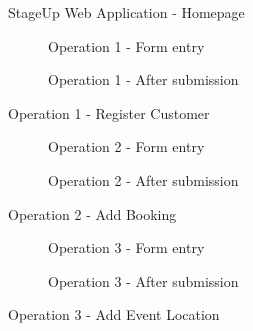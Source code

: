 \begin{figure}[H]
    \centering
    \caption{StageUp Web Application - Homepage}
\end{figure}

\begin{figure}[H]
    \centering
    \begin{subfigure}[t]{\textwidth}
        \centering
        \caption{Operation 1 - Form entry}
    \end{subfigure}
    \vspace{0.5cm}
    \begin{subfigure}[t]{\textwidth}
        \centering
        \caption{Operation 1 - After submission}
    \end{subfigure}
    \caption{Operation 1 - Register Customer}
\end{figure}

\begin{figure}[H]
    \centering
    \begin{subfigure}[t]{\textwidth}
        \centering
        \caption{Operation 2 - Form entry}
    \end{subfigure}
    \vspace{0.5cm}
    \begin{subfigure}[t]{\textwidth}
        \centering
        \caption{Operation 2 - After submission}
    \end{subfigure}
    \caption{Operation 2 - Add Booking}
\end{figure}

\begin{figure}[H]
    \centering
    \begin{subfigure}[t]{\textwidth}
        \centering
        \caption{Operation 3 - Form entry}
    \end{subfigure}
    \vspace{0.5cm}
    \begin{subfigure}[t]{\textwidth}
        \centering
        \caption{Operation 3 - After submission}
    \end{subfigure}
    \caption{Operation 3 - Add Event Location}
\end{figure}

